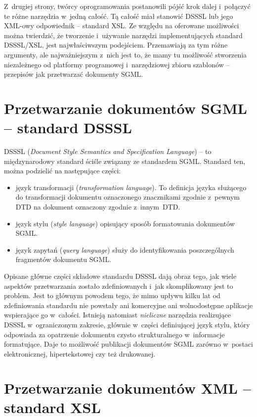 \documentclass[brudnopis]{xmgr}
\begin{document}
Z~drugiej strony, twórcy oprogramowania postanowili pójść krok dalej
i~połączyć te różne narzędzia w~jedną całość. Tą całość miał stanowić
DSSSL lub jego XML-owy odpowiednik -- standard XSL. Ze względu na
oferowane możliwości można twierdzić, że tworzenie i~używanie narzędzi
implementujących standard DSSSL/XSL, jest najwłaściwszym
podejściem. Przemawiają za tym różne argumenty, ale najważniejszym
z~nich jest to, że mamy tu możliwość stworzenia niezależnego od
platformy programowej i~narzędziowej zbioru szablonów -- przepisów jak
przetwarzać dokumenty SGML.
    
\section{Przetwarzanie dokumentów SGML -- standard DSSSL\label{s:dsssl}}

DSSSL (\textit{Document Style Semantics and Specification Language\/})
-- to międzynarodowy standard ściśle związany ze standardem SGML.
Standard ten, można podzielić na następujące części:

\begin{itemize}
\item język transformacji (\textit{transformation language\/}).  To
  definicja języka służącego do transformacji dokumentu oznaczonego
  znacznikami zgodnie z~pewnym DTD na dokument oznaczony zgodnie
  z~innym~DTD.
\item język stylu (\textit{style language\/}) opisujący sposób
  formatowania dokumentów SGML.
\item język zapytań (\textit{query language\/}) służy do
  identyfikowania poszczególnych fragmentów dokumentu SGML.
\end{itemize}

Opisane główne części składowe standardu DSSSL dają obraz tego, jak
wiele aspektów przetwarzania zostało zdefiniowanych i~jak
skomplikowany jest to problem. Jest to głównym powodem tego, że mimo
upływu kilku lat od zdefiniowania standardu nie powstały ani
komercyjne ani wolnodostępne aplikacje wspierające go
w~całości. Istnieją natomiast \emph{nieliczne\/} narzędzia realizujące
DSSSL w~ograniczonym zakresie, głównie w~części definiującej język
stylu, który odpowiada za opatrzenie dokumentu czysto strukturalnego
w~informacje formatujące. Daje to możliwość publikacji dokumentów SGML
zarówno w~postaci elektronicznej, hipertekstowej czy też drukowanej.
      
\section{Przetwarzanie dokumentów XML -- standard XSL\label{s:xsl}}
\end{document}
